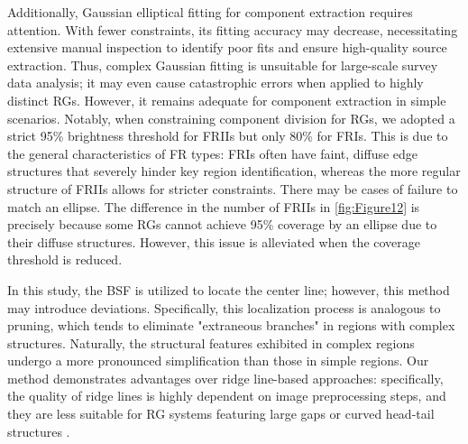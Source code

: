 \documentclass{aa}
\begin{document}
Additionally, Gaussian elliptical fitting for component extraction requires attention. With fewer constraints, its fitting accuracy may decrease, necessitating extensive manual inspection to identify poor fits and ensure high-quality source extraction. Thus, complex Gaussian fitting is unsuitable for large-scale survey data analysis; it may even cause catastrophic errors when applied to highly distinct RGs. However, it remains adequate for component extraction in simple scenarios. Notably, when constraining component division for RGs, we adopted a strict 95\% brightness threshold for FRIIs but only 80\% for FRIs. This is due to the general characteristics of FR types: FRIs often have faint, diffuse edge structures that severely hinder key region identification, whereas the more regular structure of FRIIs allows for stricter constraints. There may be cases of failure to match an ellipse. The difference in the number of FRIIs in \autoref{fig:Figure12} is precisely because some RGs cannot achieve 95\% coverage by an ellipse due to their diffuse structures. However, this issue is alleviated when the coverage threshold is reduced.


In this study, the BSF is utilized to locate the center line; however, this method may introduce deviations. Specifically, this localization process is analogous to pruning, which tends to eliminate "extraneous branches" in regions with complex structures. Naturally, the structural features exhibited in complex regions undergo a more pronounced simplification than those in simple regions. Our method demonstrates advantages over ridge line-based approaches: specifically, the quality of ridge lines is highly dependent on image preprocessing steps, and they are less suitable for RG systems featuring large gaps or curved head-tail structures \citep[e.g.,][]{barkus_application_2021,clews_radio-loud_2025}.



\end{document}
